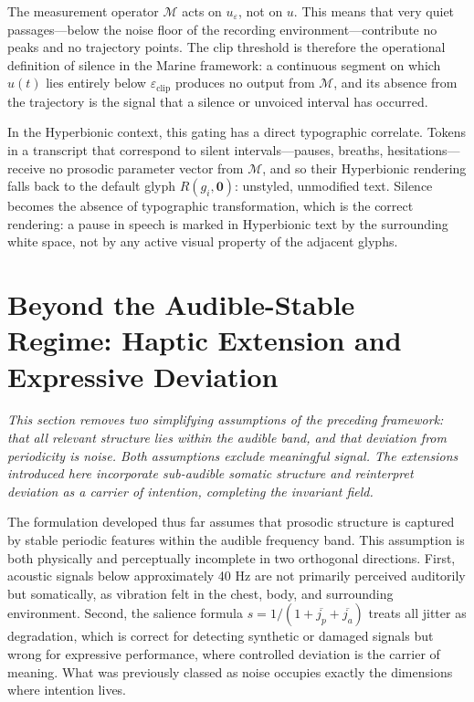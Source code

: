 \documentclass[12pt, a4paper]{article}
\begin{document}
The measurement operator $\mathcal{M}$ acts on $u_\varepsilon$, not on $u$. This means that very quiet passages---below the noise floor of the recording environment---contribute no peaks and no trajectory points. The clip threshold is therefore the operational definition of silence in the Marine framework: a continuous segment on which $u(t)$ lies entirely below $\varepsilon_{\mathrm{clip}}$ produces no output from $\mathcal{M}$, and its absence from the trajectory is the signal that a silence or unvoiced interval has occurred.

In the Hyperbionic context, this gating has a direct typographic correlate. Tokens in a transcript that correspond to silent intervals---pauses, breaths, hesitations---receive no prosodic parameter vector from $\mathcal{M}$, and so their Hyperbionic rendering falls back to the default glyph $R(g_i, \mathbf{0})$: unstyled, unmodified text. Silence becomes the absence of typographic transformation, which is the correct rendering: a pause in speech is marked in Hyperbionic text by the surrounding white space, not by any active visual property of the adjacent glyphs.


\section{Beyond the Audible-Stable Regime: Haptic Extension and Expressive Deviation}

\noindent\textit{This section removes two simplifying assumptions of the preceding framework: that all relevant structure lies within the audible band, and that deviation from periodicity is noise. Both assumptions exclude meaningful signal. The extensions introduced here incorporate sub-audible somatic structure and reinterpret deviation as a carrier of intention, completing the invariant field.}


The formulation developed thus far assumes that prosodic structure is captured by stable periodic features within the audible frequency band. This assumption is both physically and perceptually incomplete in two orthogonal directions. First, acoustic signals below approximately 40 Hz are not primarily perceived auditorily but somatically, as vibration felt in the chest, body, and surrounding environment. Second, the salience formula $s = 1/(1 + \overline{j_p} + \overline{j_a})$ treats all jitter as degradation, which is correct for detecting synthetic or damaged signals but wrong for expressive performance, where controlled deviation is the carrier of meaning. What was previously classed as noise occupies exactly the dimensions where intention lives.
\end{document}
